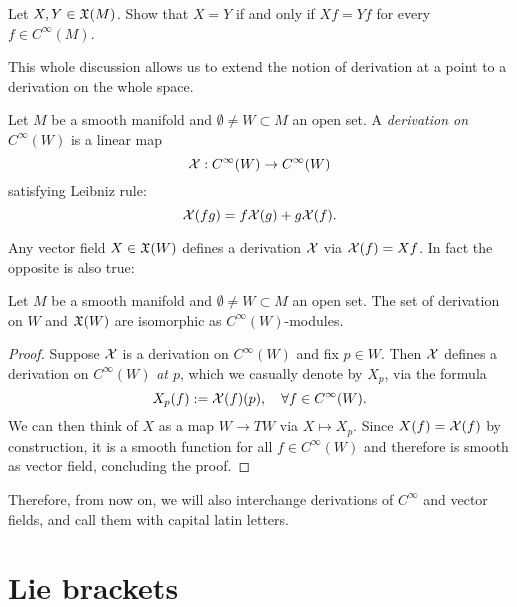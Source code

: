 \begin{exercise}
  Let $X,Y\in\mathfrak{X}(M)$.
  Show that $X=Y$ if and only if $Xf = Yf$ for every $f\in C^\infty(M)$.
\end{exercise}

This whole discussion allows us to extend the notion of derivation at a point to a derivation on the whole space.
\begin{definition}
  Let $M$ be a smooth manifold and $\emptyset\neq W\subset M$ an open set.
  A \emph{derivation on $C^\infty(W)$} is a linear map
  \begin{equation}
    \mathcal{X}:C^\infty(W)\to C^\infty(W)
  \end{equation}
  satisfying Leibniz rule:
  \begin{equation}
    \mathcal{X}(fg) = f \mathcal{X}(g) + g \mathcal{X}(f).
  \end{equation}
\end{definition}

Any vector field $X\in\mathfrak{X}(W)$ defines a derivation $\mathcal{X}$ via $\mathcal{X}(f) = Xf$. In fact the opposite is also true:
\begin{proposition}
  Let $M$ be a smooth manifold and $\emptyset\neq W\subset M$ an open set.
  The set of derivation on $W$ and $\mathfrak{X}(W)$ are isomorphic as $C^\infty(W)$-modules.
\end{proposition}
\begin{proof}
  Suppose $\mathcal{X}$ is a derivation on $C^\infty(W)$ and fix $p\in W$. Then $\mathcal{X}$ defines a derivation on $C^\infty(W)$ \emph{at $p$}, which we casually denote by $X_p$, via the formula
  \begin{equation}
    X_p(f) := \mathcal{X}(f)(p), \quad\forall f\in C^\infty(W).
  \end{equation}
  We can then think of $X$ as a map $W\to TW$ via $X\mapsto X_p$.
  Since $X(f)=\mathcal{X}(f)$ by construction, it is a smooth function for all $f\in C^\infty(W)$ and therefore is smooth as vector field, concluding the proof.
\end{proof}

Therefore, from now on, we will also interchange derivations of $C^\infty$ and vector fields, and call them with capital latin letters.

\section{Lie brackets}

